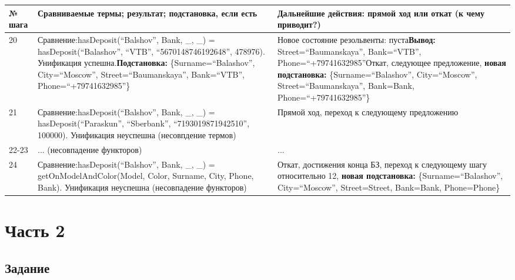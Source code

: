 \documentclass[14pt,a4paper]{scrreprt}
\begin{document}
\begin{table}[H]
\begin{tabular}{|p{1.2cm\small}|p{9cm\small}|p{5cm\small}|}
		\hline
	\end{tabular}
\end{table}

\begin{table}[H]
	\begin{tabular}{|p{1.2cm\small}|p{9cm\small}|p{5cm\small}|}
		\hline
		№ шага & Сравниваемые термы; результат; подстановка, если есть & Дальнейшие действия: прямой ход или откат (к чему приводит?)\\
		\hline
		20 & Сравнение:\linebreak hasDeposit(``Balshov'', Bank, \_, \_) = hasDeposit(``Balashov'', ``VTB'', ``5670148746192648'', 478976). Унификация успешна.\linebreak \textbf{Подстановка:} \{Surname=``Balashov'', City=``Moscow'', Street=``Baumanskaya'', Bank=``VTB'', Phone=``+79741632985''\} & Новое состояние резольвенты: пуста\linebreak \textbf{Вывод:} Street=``Baumanskaya'', Bank=``VTB'', Phone=``+79741632985''\linebreak Откат, следующее предложение, \textbf{новая подстановка:} \{Surname=``Balashov'', City=``Moscow'', Street=``Baumanskaya'', Bank=Bank, Phone=``+79741632985''\}\\
		\hline
		21 & Сравнение:\linebreak hasDeposit(``Balshov'', Bank, \_, \_) = hasDeposit(``Paraskun'', ``Sberbank'', ``7193019871942510'', 100000). Унификация неуспешна (несовпдение термов) & Прямой ход, переход к следующему предложению\\
		\hline
		22-23 & ... (несовпадение функторов) & ...\\
		\hline
		24 & Сравнение:\linebreak hasDeposit(``Balshov'', Bank, \_, \_) = getOnModelAndColor(Model, Color, Surname, City, Phone, Bank). Унификация неуспешна (несовпадение функторов) & Откат, достижения конца БЗ, переход к следующему шагу относительно 12, \textbf{новая подстановка:} \{Surname=``Balashov'', City=``Moscow'', Street=Street, Bank=Bank, Phone=Phone\}\\
		\hline
	\end{tabular}
\end{table}

\chapter{Часть 2}

\section{Задание}
\end{document}
